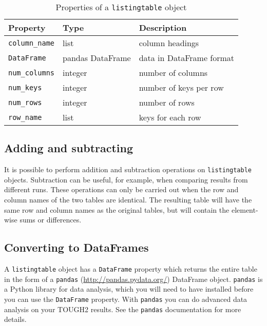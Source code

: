 \begin{table}
  \begin{center}
    \begin{tabular}{|l|l|l|}
      \hline
      \textbf{Property} & \textbf{Type} & \textbf{Description}\\
      \hline
      \texttt{column\_name} & list & column headings\\
      \texttt{DataFrame} & pandas DataFrame & data in DataFrame format\\
      \texttt{num\_columns} & integer & number of columns \\
      \texttt{num\_keys} & integer & number of keys per row \\
      \texttt{num\_rows} & integer & number of rows \\
      \texttt{row\_name} & list & keys for each row \\
      \hline
    \end{tabular}
    \caption{Properties of a \texttt{listingtable} object}
    \label{tb:listingtable_properties}
  \end{center}
\end{table}

\subsection{Adding and subtracting}
It is possible to perform addition and subtraction operations on \texttt{listingtable} objects.  Subtraction can be useful, for example, when comparing results from different runs.  These operations can only be carried out when the row and column names of the two tables are identical.  The resulting table will have the same row and column names as the original tables, but will contain the element-wise sums or differences.

\subsection{Converting to DataFrames}

A \texttt{listingtable} object has a \texttt{DataFrame} property which returns the entire table in the form of a \texttt{pandas} (\url{http://pandas.pydata.org/}) DataFrame object. \texttt{pandas} is a Python library for data analysis, which you will need to have installed before you can use the \texttt{DataFrame} property. With \texttt{pandas} you can do advanced data analysis on your TOUGH2 results. See the \texttt{pandas} documentation for more details.

